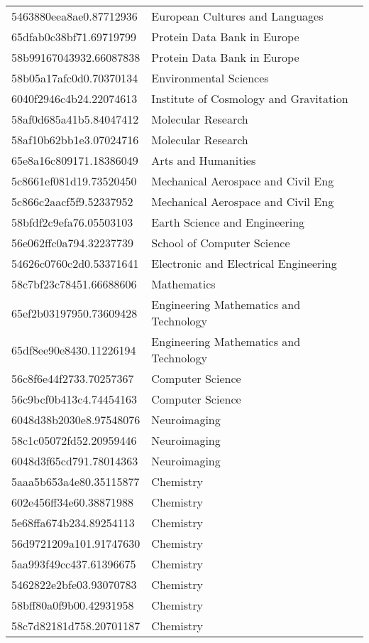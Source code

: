 \begin{tabular}{ll}
5463880eea8ae0.87712936 & European Cultures and Languages \\
65dfab0c38bf71.69719799 & Protein Data Bank in Europe \\
58b99167043932.66087838 & Protein Data Bank in Europe \\
58b05a17afc0d0.70370134 & Environmental Sciences \\
6040f2946c4b24.22074613 & Institute of Cosmology and Gravitation \\
58af0d685a41b5.84047412 & Molecular Research \\
58af10b62bb1e3.07024716 & Molecular Research \\
65e8a16c809171.18386049 & Arts and Humanities \\
5c8661ef081d19.73520450 & Mechanical Aerospace and Civil Eng \\
5c866c2aacf5f9.52337952 & Mechanical Aerospace and Civil Eng \\
58bfdf2c9efa76.05503103 & Earth Science and Engineering \\
56e062ffc0a794.32237739 & School of Computer Science \\
54626c0760c2d0.53371641 & Electronic and Electrical Engineering \\
58c7bf23c78451.66688606 & Mathematics \\
65ef2b03197950.73609428 & Engineering Mathematics and Technology \\
65df8ee90e8430.11226194 & Engineering Mathematics and Technology \\
56c8f6e44f2733.70257367 & Computer Science \\
56c9bcf0b413c4.74454163 & Computer Science \\
6048d38b2030e8.97548076 & Neuroimaging \\
58c1c05072fd52.20959446 & Neuroimaging \\
6048d3f65cd791.78014363 & Neuroimaging \\
5aaa5b653a4e80.35115877 & Chemistry \\
602e456ff34e60.38871988 & Chemistry \\
5e68ffa674b234.89254113 & Chemistry \\
56d9721209a101.91747630 & Chemistry \\
5aa993f49cc437.61396675 & Chemistry \\
5462822e2bfe03.93070783 & Chemistry \\
58bff80a0f9b00.42931958 & Chemistry \\
58c7d82181d758.20701187 & Chemistry \\

\end{tabular}
